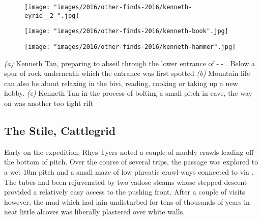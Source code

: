 \begin{pagefigure}
\checkoddpage \ifoddpage \forcerectofloat \else \forceversofloat \fi
\centering

    \begin{subfigure}[t]{0.5435\textwidth}
        \centering
        \texttt{[image: "images/2016/other-finds-2016/kenneth-eyrie\_\_2\_".jpg]} 
        \caption{} \label{moon door}
    \end{subfigure}
        \hfill
\begin{subfigure}[t]{0.4465\textwidth}
\centering
\texttt{[image: "images/2016/other-finds-2016/kenneth-book".jpg]}
 \caption{}\label{reading in the bivi}
\end{subfigure}
    \vspace{0cm}
    \begin{subfigure}[t]{\textwidth}
    \centering
        \texttt{[image: "images/2016/other-finds-2016/kenneth-hammer".jpg]} 
        \caption{} \label{hammer in B9}
    \end{subfigure}
    \caption{
    \emph{(a)}  Kenneth Tan, preparing to abseil through the lower entrance of \protect{} - \protect{} - \protect{}. Below a spur of rock underneath which the \protect{} entrance was first spotted 
     \emph{(b)} Mountain life can also be about relaxing in the bivi, reading, cooking or taking up a new hobby.
     \emph{(c)}  Kenneth Tan in the process of bolting a small pitch in \protect{} cave, the way on was another too tight rift }
\end{pagefigure}

\subsection{The Stile, Cattlegrid}
Early on the expedition, Rhys Tyers noted a couple of muddy crawls leading off the bottom of  pitch. Over the course of several trips, the  passage was explored to a wet 10m pitch and a small maze of low phreatic crawl-ways connected to  via . The tubes had been rejuvenated by two vadose steams whose stepped descent provided a relatively easy access to the pushing front. After a couple of visits however, the mud which had lain undisturbed for tens of thousands of years in neat little alcoves was liberally plastered over white walls.

